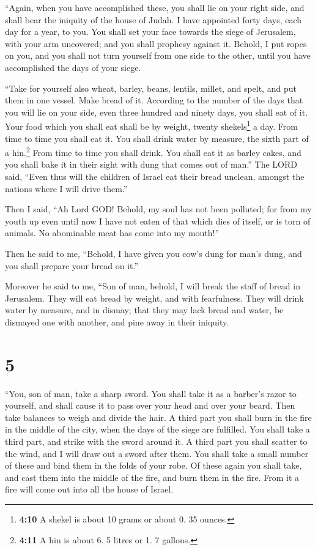  ``Again, when you have accomplished these, you shall lie
on your right side, and shall bear the iniquity of the house of Judah. I
have appointed forty days, each day for a year, to you. 
You shall set your face towards the siege of Jerusalem, with your arm
uncovered; and you shall prophesy against it.  Behold, I
put ropes on you, and you shall not turn yourself from one side to the
other, until you have accomplished the days of your siege.

 ``Take for yourself also wheat, barley, beans, lentils,
millet, and spelt, and put them in one vessel. Make bread of it.
According to the number of the days that you will lie on your side, even
three hundred and ninety days, you shall eat of it.  Your
food which you shall eat shall be by weight, twenty shekels\footnote{\textbf{4:10}
  A shekel is about 10 grams or about 0. 35 ounces.} a day. From time to
time you shall eat it.  You shall drink water by measure,
the sixth part of a hin.\footnote{\textbf{4:11} A hin is about 6. 5
  litres or 1. 7 gallons.} From time to time you shall drink.
 You shall eat it as barley cakes, and you shall bake it
in their sight with dung that comes out of man.''  The
LORD said, ``Even thus will the children of Israel eat their bread
unclean, amongst the nations where I will drive them.''

 Then I said, ``Ah Lord GOD! Behold, my soul has not been
polluted; for from my youth up even until now I have not eaten of that
which dies of itself, or is torn of animals. No abominable meat has come
into my mouth!''

 Then he said to me, ``Behold, I have given you cow's
dung for man's dung, and you shall prepare your bread on it.''

 Moreover he said to me, ``Son of man, behold, I will
break the staff of bread in Jerusalem. They will eat bread by weight,
and with fearfulness. They will drink water by measure, and in dismay;
 that they may lack bread and water, be dismayed one with
another, and pine away in their iniquity.

\hypertarget{section-4}{%
\section{5}\label{section-4}}

 ``You, son of man, take a sharp sword. You shall take it
as a barber's razor to yourself, and shall cause it to pass over your
head and over your beard. Then take balances to weigh and divide the
hair.  A third part you shall burn in the fire in the
middle of the city, when the days of the siege are fulfilled. You shall
take a third part, and strike with the sword around it. A third part you
shall scatter to the wind, and I will draw out a sword after them.
 You shall take a small number of these and bind them in
the folds of your robe.  Of these again you shall take,
and cast them into the middle of the fire, and burn them in the fire.
From it a fire will come out into all the house of Israel.

